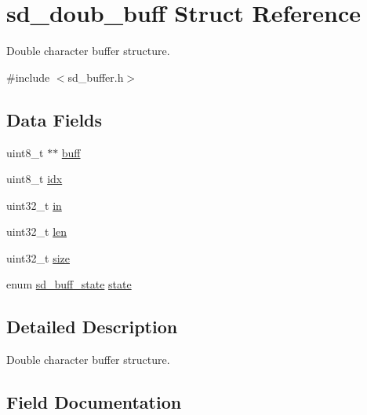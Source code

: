\hypertarget{structsd__doub__buff}{}\section{sd\+\_\+doub\+\_\+buff Struct Reference}
\label{structsd__doub__buff}


Double character buffer structure.  




{\ttfamily \#include $<$sd\+\_\+buffer.\+h$>$}

\subsection*{Data Fields}
\begin{DoxyCompactItemize}
\item 
uint8\+\_\+t $\ast$$\ast$ \mbox{\hyperlink{structsd__doub__buff_ab84d5132e2a1a9a82456a200085411a8}{buff}}
\item 
uint8\+\_\+t \mbox{\hyperlink{structsd__doub__buff_a266732d9c228f9bac150e7554734d112}{idx}}
\item 
uint32\+\_\+t \mbox{\hyperlink{structsd__doub__buff_a86fd6c417fa43c58339f7cde29495419}{in}}
\item 
uint32\+\_\+t \mbox{\hyperlink{structsd__doub__buff_a96bbf959016e4411c9e6b9812a8be60a}{len}}
\item 
uint32\+\_\+t \mbox{\hyperlink{structsd__doub__buff_ab2c6b258f02add8fdf4cfc7c371dd772}{size}}
\item 
enum \mbox{\hyperlink{group___s_d___buffer___types_ga52f14e9c7b7d9ba092e1cd615559012b}{sd\+\_\+buff\+\_\+state}} \mbox{\hyperlink{structsd__doub__buff_aa88ff4ca3b7aaba9e9aaa27fd9ea94a9}{state}}
\end{DoxyCompactItemize}


\subsection{Detailed Description}
Double character buffer structure. 

\subsection{Field Documentation}
\mbox{\label{structsd__doub__buff_ab84d5132e2a1a9a82456a200085411a8}} 

